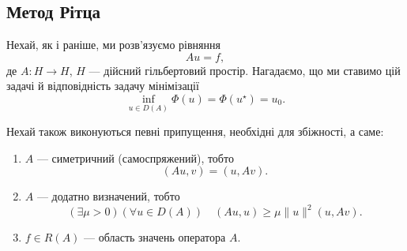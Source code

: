 \subsection{Метод Рітца}

Нехай, як і раніше, ми розв'язуємо рівняння
\begin{equation}
    \label{eq:3.2.1}
    A u = f,
\end{equation}
де $A: H \to H$, $H$ --- дійсний гільбертовий простір. Нагадаємо, що ми ставимо цій задачі й відповідність задачу мінімізації
\begin{equation}
    \label{eq:3.2.2}
    \inf_{u \in D(A)} \Phi(u) = \Phi(u^\star) = u_0.
\end{equation}

Нехай також виконуються певні припущення, необхідні для збіжності, а саме:
\begin{enumerate}
    \item $A$ --- симетричний (самоспряжений), тобто
    \begin{equation}
        \label{eq:3.2.3}
        (A u, v) = (u, A v).
    \end{equation}
    \item $A$ --- додатно визначений, тобто
    \begin{equation}
        \label{eq:3.2.4}
        (\exists \mu > 0) (\forall u \in D(A)) \quad (A u, u) \ge \mu \|u\|^2 (u, A v).
    \end{equation}
    \item $f \in R(A)$ --- область значень оператора $A$.
\end{enumerate}

